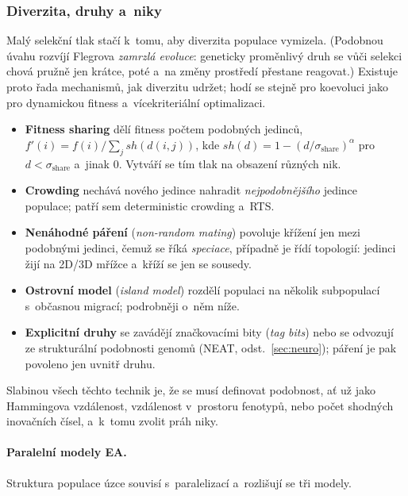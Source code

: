 \documentclass[11pt,a4paper]{article}
\theoremstyle{definition}
\begin{document}
\subsubsection{Diverzita, druhy a~niky}

Malý selekční tlak stačí k~tomu, aby diverzita populace vymizela. (Podobnou úvahu rozvíjí
Flegrova \emph{zamrzlá evoluce}: geneticky proměnlivý druh se vůči selekci chová pružně jen
krátce, poté  a~na změny prostředí přestane reagovat.) Existuje proto řada
mechanismů, jak diverzitu udržet; hodí se stejně pro koevoluci jako pro dynamickou fitness
a~vícekriteriální optimalizaci.

\begin{itemize}
\item \textbf{Fitness sharing} dělí fitness počtem podobných jedinců,
  $f'(i) = f(i)/\sum_j sh(d(i,j))$, kde
  $sh(d) = 1-(d/\sigma_{\mathrm{share}})^{\alpha}$ pro $d < \sigma_{\mathrm{share}}$
  a~jinak 0. Vytváří se tím tlak na obsazení různých nik.
\item \textbf{Crowding} nechává nového jedince nahradit \emph{nejpodobnějšího} jedince
  populace; patří sem deterministic crowding a~RTS.
\item \textbf{Nenáhodné páření} (\emph{non-random mating}) povoluje křížení jen mezi
  podobnými jedinci, čemuž se říká \emph{speciace}, případně je řídí topologií: jedinci
  žijí na 2D/3D mřížce a~kříží se jen se sousedy.
\item \textbf{Ostrovní model} (\emph{island model}) rozdělí populaci na několik subpopulací
  s~občasnou migrací; podrobněji o~něm níže.
\item \textbf{Explicitní druhy} se zavádějí značkovacími bity (\emph{tag bits}) nebo se
  odvozují ze strukturální podobnosti genomů (NEAT, odst.~\ref{sec:neuro}); páření je pak
  povoleno jen uvnitř druhu.
\end{itemize}
Slabinou všech těchto technik je, že se musí definovat podobnost, ať už jako Hammingova
vzdálenost, vzdálenost v~prostoru fenotypů, nebo počet shodných inovačních čísel, a~k~tomu
zvolit práh niky.

\paragraph{Paralelní modely EA.} Struktura populace úzce souvisí s~paralelizací a~rozlišují
se tři modely.
\end{document}
